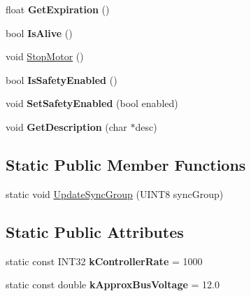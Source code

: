\begin{DoxyCompactItemize}
\item 
\hypertarget{classCANJaguar_afa39a3fa4e710f40466e47b51d3eb889}{
float {\bfseries GetExpiration} ()}
\label{classCANJaguar_afa39a3fa4e710f40466e47b51d3eb889}

\item 
\hypertarget{classCANJaguar_acd27267ca0452efd67384664ee8ce4c4}{
bool {\bfseries IsAlive} ()}
\label{classCANJaguar_acd27267ca0452efd67384664ee8ce4c4}

\item 
void \hyperlink{classCANJaguar_a5ce4840f1e80913836cfb2ddb2d7d50b}{StopMotor} ()
\item 
\hypertarget{classCANJaguar_a7a74176fcaa2689cb28b43f6b01397ae}{
bool {\bfseries IsSafetyEnabled} ()}
\label{classCANJaguar_a7a74176fcaa2689cb28b43f6b01397ae}

\item 
\hypertarget{classCANJaguar_a0a8faf4d9564c4d78dd3177b6dd66f90}{
void {\bfseries SetSafetyEnabled} (bool enabled)}
\label{classCANJaguar_a0a8faf4d9564c4d78dd3177b6dd66f90}

\item 
\hypertarget{classCANJaguar_a2daf96a8f9f0e8682e505e8b9c6541e7}{
void {\bfseries GetDescription} (char $\ast$desc)}
\label{classCANJaguar_a2daf96a8f9f0e8682e505e8b9c6541e7}

\end{DoxyCompactItemize}
\subsection*{Static Public Member Functions}
\begin{DoxyCompactItemize}
\item 
static void \hyperlink{classCANJaguar_afbd06237b0fbdd5b35cdb7452937269e}{UpdateSyncGroup} (UINT8 syncGroup)
\end{DoxyCompactItemize}
\subsection*{Static Public Attributes}
\begin{DoxyCompactItemize}
\item 
\hypertarget{classCANJaguar_ad495131fc2f4345f5bb291b46cb10418}{
static const INT32 {\bfseries kControllerRate} = 1000}
\label{classCANJaguar_ad495131fc2f4345f5bb291b46cb10418}

\item 
\hypertarget{classCANJaguar_a20754925d6f0f3b20063fd469c275a54}{
static const double {\bfseries kApproxBusVoltage} = 12.0}
\label{classCANJaguar_a20754925d6f0f3b20063fd469c275a54}

\end{DoxyCompactItemize}
